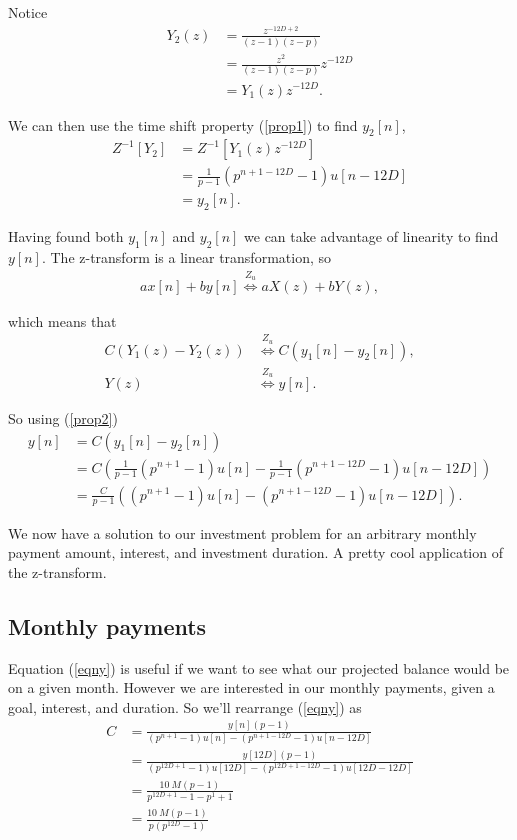 \documentclass[letterpaper]{article}
\begin{document}
Notice 
\begin{align}
	Y_2(z) &= \frac{z^{-12D+2}}{(z-1)(z - p)} \\
	       &= \frac{z^{2}}{(z-1)(z - p)}z^{-12D} \\
	       &= Y_1(z) z^{-12D}.
\end{align}

We can then use the time shift property (\ref{prop1}) to find $y_2[n]$,
\begin{align}
	Z^{-1}\left[Y_2\right] &= Z^{-1}\left[Y_1(z) z^{-12D}\right] \\
						   &= \frac{1}{p - 1}\left(p^{n+1-12D} - 1 \right)u[n-12D] \\
						   &= y_2[n].
\end{align}

Having found both $y_1[n]$ and $y_2[n]$ we can take advantage of linearity to find $y[n]$. The z-transform is a linear transformation, so 
\begin{align}
	ax[n] + by[n] \stackrel{Z_u}{\Longleftrightarrow} aX(z) + bY(z), \label{prop2}
\end{align}

which means that 
\begin{align}
	C \left(Y_1(z) - Y_2(z) \right) &\stackrel{Z_u}{\Longleftrightarrow} C \left(y_1[n] - y_2[n] \right), \\
	Y(z) &\stackrel{Z_u}{\Longleftrightarrow} y[n].
\end{align}

So using (\ref{prop2})
\begin{align}
	y[n] &= C(y_1[n] - y_2[n]) \\
		 &= C \left(\frac{1}{p - 1}\left(p^{n+1} - 1 \right)u[n] - \frac{1}{p - 1}\left(p^{n+1-12D} - 1 \right)u[n-12D] \right) \\
		 &= \frac{C}{p - 1}\left(\left(p^{n+1} - 1 \right)u[n] - \left(p^{n+1-12D} - 1 \right)u[n-12D] \right). \label{eqny}
\end{align}

We now have a solution to our investment problem for an arbitrary monthly payment amount, interest, and investment duration. A pretty cool application of the z-transform. 

\subsection{Monthly payments}
Equation (\ref{eqny}) is useful if we want to see what our projected balance would be on a given month. However we are interested in our monthly payments, given a goal, interest, and duration. So we'll rearrange (\ref{eqny}) as
\begin{align}
	C &= \frac{y[n](p - 1)}{\left(p^{n+1} - 1 \right)u[n] - \left(p^{n+1-12D} - 1 			\right)u[n-12D]} \\
	  &= \frac{y[12D](p - 1)}{\left(p^{12D+1} - 1 \right)u[12D] - \left(p^{12D+1-12D} - 1 \right)u[12D-12D]} \\
	  &= \frac{\SI{10}{M}(p - 1)}{p^{12D+1} - 1 - p^1 + 1} \\
	  &= \frac{\SI{10}{M}(p - 1)}{p\left(p^{12D} - 1\right)}
\end{align}
\end{document}
